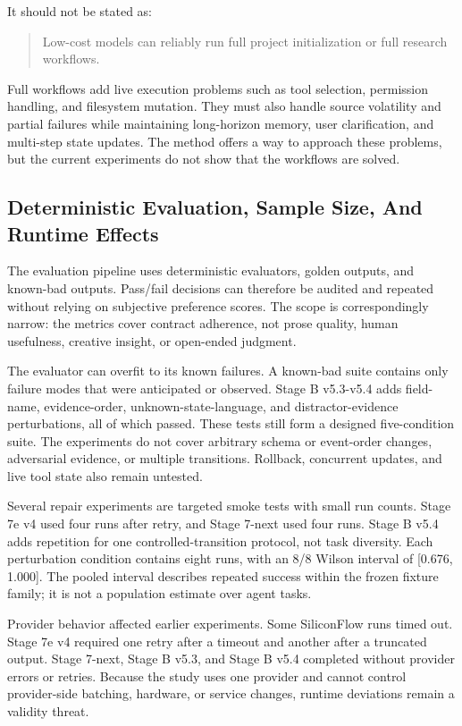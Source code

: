 \documentclass[11pt]{article}
\begin{document}
It should not be stated as:

\begin{quote}
Low-cost models can reliably run full project initialization or full research workflows.
\end{quote}

Full workflows add live execution problems such as tool selection, permission handling, and filesystem mutation. They must also handle source volatility and partial failures while maintaining long-horizon memory, user clarification, and multi-step state updates. The method offers a way to approach these problems, but the current experiments do not show that the workflows are solved.

\subsection{Deterministic Evaluation, Sample Size, And Runtime Effects}

The evaluation pipeline uses deterministic evaluators, golden outputs, and known-bad outputs. Pass/fail decisions can therefore be audited and repeated without relying on subjective preference scores. The scope is correspondingly narrow: the metrics cover contract adherence, not prose quality, human usefulness, creative insight, or open-ended judgment.

The evaluator can overfit to its known failures. A known-bad suite contains only failure modes that were anticipated or observed. Stage B v5.3-v5.4 adds field-name, evidence-order, unknown-state-language, and distractor-evidence perturbations, all of which passed. These tests still form a designed five-condition suite. The experiments do not cover arbitrary schema or event-order changes, adversarial evidence, or multiple transitions. Rollback, concurrent updates, and live tool state also remain untested.

Several repair experiments are targeted smoke tests with small run counts. Stage 7e v4 used four runs after retry, and Stage 7-next used four runs. Stage B v5.4 adds repetition for one controlled-transition protocol, not task diversity. Each perturbation condition contains eight runs, with an 8/8 Wilson interval of [0.676, 1.000]. The pooled interval describes repeated success within the frozen fixture family; it is not a population estimate over agent tasks.

Provider behavior affected earlier experiments. Some SiliconFlow runs timed out. Stage 7e v4 required one retry after a timeout and another after a truncated output. Stage 7-next, Stage B v5.3, and Stage B v5.4 completed without provider errors or retries. Because the study uses one provider and cannot control provider-side batching, hardware, or service changes, runtime deviations remain a validity threat.
\end{document}
